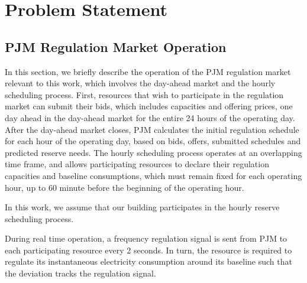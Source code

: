 %
%


\section{Problem Statement}
\label{sec:problem_statement}


\subsection{PJM Regulation Market Operation }

In this section, we briefly describe the operation of the PJM regulation market relevant to this work, which involves the day-ahead market and the hourly scheduling process.
First, resources that wish to participate in the regulation market can submit their bids, which includes capacities and offering prices, one day ahead in the day-ahead market for the entire 24 hours of the operating day. 
After the day-ahead market closes, PJM calculates the initial regulation schedule for each hour of the operating day, based on bids, offers, submitted schedules and predicted reserve needs. %
The hourly scheduling process operates at an overlapping time frame, and allows participating resources to declare their regulation capacities and baseline consumptions, which must remain fixed for each operating hour, up to 60 minute before the beginning of the operating hour.
\begin{assumption}
In this work, we assume that our building participates in the hourly reserve scheduling process.
\end{assumption}

During real time operation, a frequency regulation signal is sent from PJM to each participating resource every 2 seconds. In turn, the resource is required to regulate its instantaneous electricity consumption around its baseline such that the deviation tracks the regulation signal.

